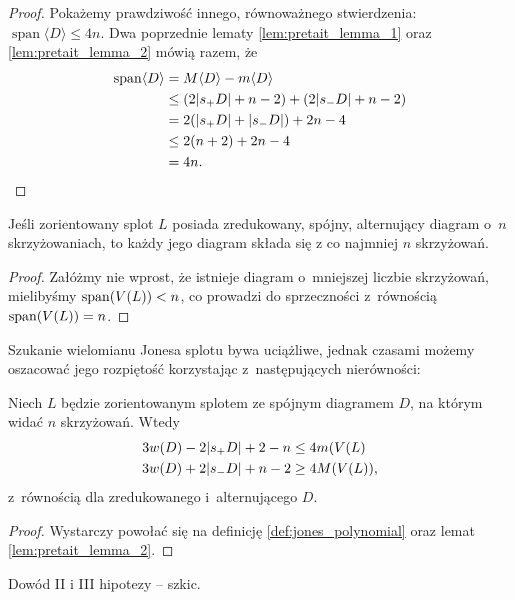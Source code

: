 \begin{proof}
    Pokażemy prawdziwość innego, równoważnego stwierdzenia: $\operatorname{span} \langle D\rangle\le 4n$.
    Dwa poprzednie lematy \ref{lem:pretait_lemma_1} oraz \ref{lem:pretait_lemma_2} mówią razem, że
    \begin{align}
        \operatorname{span}\langle D\rangle
        & = M\langle D\rangle - m\langle D\rangle \\
        & \le (2|s_+D|+n-2)+(2|s_-D|+n-2) \\
        & = 2(|s_+D|+|s_- D|)+2n-4 \\
        & \le 2(n+2)+2n-4 \\
        & = 4n. \qedhere
    \end{align}
\end{proof}

\begin{conjecture}[Tait]
    \label{taitjones}
    Jeśli zorientowany splot $L$ posiada zredukowany, spójny, alternujący diagram o~$n$ skrzyżowaniach, to każdy jego diagram składa się z co najmniej $n$ skrzyżowań.
\end{conjecture}

\begin{proof}
    Załóżmy nie wprost, że istnieje diagram o~mniejszej liczbie skrzyżowań,
    mielibyśmy $\operatorname{span} (V(L)) < n$, co prowadzi do sprzeczności z~równością $\operatorname{span} (V(L)) = n$.
\end{proof}

Szukanie wielomianu Jonesa splotu bywa uciążliwe,
jednak czasami możemy oszacować jego rozpiętość korzystając z~następujących nierówności:

\begin{corollary}
    Niech $L$ będzie zorientowanym splotem ze spójnym diagramem $D$, na którym widać $n$ skrzyżowań.
    Wtedy
    \begin{align}
        3w(D) - 2|s_+D| + 2 - n & \le 4 m(V(L) \\
        3w(D) + 2|s_-D| + n - 2 & \ge 4 M(V(L)),
    \end{align}
    z~równością dla zredukowanego i~alternującego $D$.
\end{corollary}

\begin{proof}
    Wystarczy powołać się na definicję \ref{def:jones_polynomial} oraz lemat \ref{lem:pretait_lemma_2}.
\end{proof}

\begin{tobedone}
    Dowód II i III hipotezy -- szkic.
\end{tobedone}

